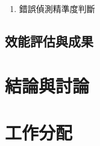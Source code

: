 \documentclass[12pt,a4paper]{report}
\begin{document}
\begin{CJK*}{UTF8}{bkai}
\begin{enumerate}
        \item 錯誤偵測精準度判斷



    \end{enumerate}

    \section{效能評估與成果}


    \chapter{結論與討論}
    \chapter{工作分配}
    \begin{table}[htbp]
        \vspace{0.3cm}
\end{table}
\end{CJK*}
\end{document}
